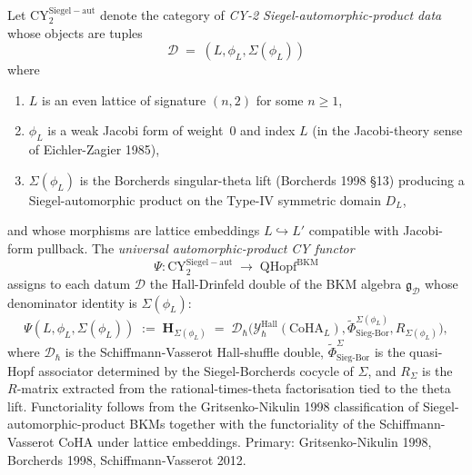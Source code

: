 \begin{definition}
\label{def:universal-psi-functor}
Let $\mathrm{CY}^{\mathrm{Siegel-aut}}_2$ denote the category of
\emph{CY-2 Siegel-automorphic-product data} whose objects are tuples
\[
 \mathcal D \;=\; (L, \phi_L, \Sigma(\phi_L))
\]
where
\begin{enumerate}
 \item $L$ is an even lattice of signature $(n,2)$ for some $n\geq 1$,
 \item $\phi_L$ is a weak Jacobi form of weight~$0$ and index $L$
 (in the Jacobi-theory sense of Eichler-Zagier 1985),
 \item $\Sigma(\phi_L)$ is the Borcherds singular-theta lift
 (Borcherds 1998 \S13) producing a Siegel-automorphic product
 on the Type-IV symmetric domain $D_L$,
\end{enumerate}
and whose morphisms are lattice embeddings $L\hookrightarrow L'$
compatible with Jacobi-form pullback. The \emph{universal automorphic-product
CY functor}
\[
 \Psi: \mathrm{CY}^{\mathrm{Siegel-aut}}_2 \;\longrightarrow\;
 \mathrm{QHopf}^{\mathrm{BKM}}
\]
assigns to each datum $\mathcal D$ the Hall-Drinfeld double of the BKM
algebra $\mathfrak g_{\mathcal D}$ whose denominator identity is
$\Sigma(\phi_L)$:
\[
 \Psi(L, \phi_L, \Sigma(\phi_L))
 \;:=\;
 \mathbf H_{\Sigma(\phi_L)}
 \;=\;
 \mathcal D_\hbar\bigl(\mathcal Y^{\mathrm{Hall}}_\hbar(\mathrm{CoHA}_{L}),
 \widetilde\Phi_{\mathrm{Sieg\text{-}Bor}}^{\Sigma(\phi_L)},
 R_{\Sigma(\phi_L)}\bigr),
\]
where $\mathcal D_\hbar$ is the Schiffmann-Vasserot Hall-shuffle double,
$\widetilde\Phi_{\mathrm{Sieg\text{-}Bor}}^{\Sigma}$ is the
quasi-Hopf associator determined by the Siegel-Borcherds cocycle of
$\Sigma$, and $R_{\Sigma}$ is the $R$-matrix extracted from the
rational-times-theta factorisation tied to the theta lift. Functoriality
follows from the Gritsenko-Nikulin 1998 classification of
Siegel-automorphic-product BKMs together with the functoriality of the
Schiffmann-Vasserot CoHA under lattice embeddings. Primary:
Gritsenko-Nikulin 1998, Borcherds 1998, Schiffmann-Vasserot 2012.
\end{definition}

